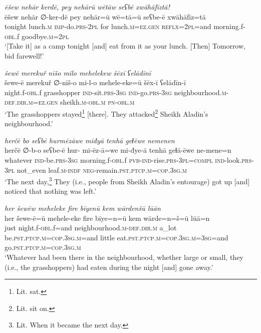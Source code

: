 \ea \label{PM.21}
\textit{ēšew nehār kerdē, pey nehārū wētāw seʕbē xwāhāfīztā!} \\ 
\gll ēšew nehār ∅-ker-dē pey nehār=ū wē=tā=ū seʕbe-ē xwāhāfīz=tā \\ 
 tonight lunch\textsc{.m} \textsc{imp-}do\textsc{.prs}-\textsc{2pl} for lunch\textsc{.m}\textsc{\textsc{=ez.gen}} \textsc{reflx}=\textsc{2pl}=and morning.f\textsc{-obl}.f goodbye\textsc{.m}=\textsc{2pl} \\ 
\glt `[Take it] as a camp tonight [and] eat from it as your lunch. [Then] Tomorrow, bid farewell!'
\z 
 
\ea \label{PM.23}
\textit{šewē merekuř nīšo milo mehelekew šēxī ʕelādīnī} \\ 
\gll šewe-ē merekuř ∅-nīš-o mi-l-o mehele-eke=ū šēx-ī ʕelādīn-ī \\ 
 night.f\textsc{-obl}.f grasshopper \textsc{ind-}sit\textsc{.prs}\textsc{-3sg} \textsc{ind-}go\textsc{.prs}\textsc{-3sg} neighbourhood\textsc{.m}\textsc{-def}\textsc{.dir}\textsc{.m}\textsc{\textsc{=ez.gen}} sheikh\textsc{.m}\textsc{-obl}\textsc{.m} \textsc{pn}\textsc{-obl}\textsc{.m} \\ 
\glt `The grasshoppers stayed\footnote{Lit. sat.} [there]. They attacked\footnote{Lit. sit on.} Sheikh Aladin’s neighbourhood.'
\z 
 
\ea \label{PM.24}
\textit{herčē bo seʕbē hurmēzāwe miđyā tenhā geɫēwe nemenen} \\ 
\gll herčē ∅-b-o seʕbe-ē hur- mi-ēz-ā=we mi-đye-ā tenhā geɫā-ēwe ne-mene=n \\ 
 whatever \textsc{ind-}be\textsc{.prs}\textsc{-3sg} morning.f\textsc{-obl}.f \textsc{pvb-}\textsc{ind-}rise\textsc{.prs}\textsc{-3pl}\textsc{=compl} \textsc{ind-}look\textsc{.prs}\textsc{-3pl} not\_even leaf\textsc{.m}\textsc{-indf} \textsc{neg-}remain\textsc{.pst}\textsc{.ptcp}\textsc{.m}\textsc{=cop}\textsc{.3sg}\textsc{.m} \\ 
\glt `The next day,\footnote{Lit. When it became the next day.} They (i.e., people from Sheikh Aladin’s entourage) got up [and] noticed that nothing was left.'
\z 
 
\ea \label{PM.27}
\textit{her šewēw meheleke fire bīyenū kem wārdenšū lūān} \\ 
\gll her šewe-ē=ū mehele-eke fire bīye=n=ū kem wārde=n=š=ū lūā=n \\ 
 just night.f\textsc{-obl}.f=and neighbourhood\textsc{.m}\textsc{-def}\textsc{.dir}\textsc{.m} a\_lot be\textsc{.pst}\textsc{.ptcp}\textsc{.m}\textsc{=cop}\textsc{.3sg}\textsc{.m}=and little eat\textsc{.pst}\textsc{.ptcp}\textsc{.m}\textsc{=cop}\textsc{.3sg}\textsc{.m}\textsc{=3sg}=and go\textsc{.pst}\textsc{.ptcp}\textsc{.m}\textsc{=cop}\textsc{.3sg}\textsc{.m} \\ 
\glt `Whatever had been there in the neighbourhood, whether large or small, they (i.e., the grasshoppers) had eaten during the night [and] gone away.'
\z 
 

